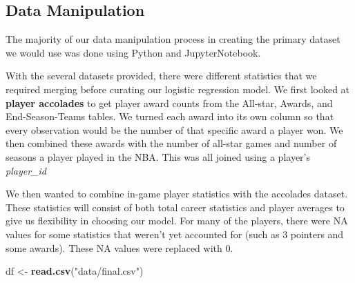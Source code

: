 \documentclass[
  11pt,
]{article}
\newenvironment{Shaded}{\begin{snugshade}}{\end{snugshade}}
\newcommand{\FunctionTok}[1]{\textcolor[rgb]{0.13,0.29,0.53}{\textbf{#1}}}
\newcommand{\NormalTok}[1]{#1}
\newcommand{\OtherTok}[1]{\textcolor[rgb]{0.56,0.35,0.01}{#1}}
\newcommand{\StringTok}[1]{\textcolor[rgb]{0.31,0.60,0.02}{#1}}
\begin{document}
\subsection{Data Manipulation}\label{data-manipulation}

The majority of our data manipulation process in creating the primary
dataset we would use was done using Python and JupyterNotebook.

With the several datasets provided, there were different statistics that
we required merging before curating our logistic regression model. We
first looked at \textbf{player accolades} to get player award counts
from the All-star, Awards, and End-Season-Teams tables. We turned each
award into its own column so that every observation would be the number
of that specific award a player won. We then combined these awards with
the number of all-star games and number of seasons a player played in
the NBA. This was all joined using a player's \emph{player\_id}

We then wanted to combine in-game player statistics with the accolades
dataset. These statistics will consist of both total career statistics
and player averages to give us flexibility in choosing our model. For
many of the players, there were NA values for some statistics that
weren't yet accounted for (such as 3 pointers and some awards). These NA
values were replaced with 0.

\begin{Shaded}
\begin{Highlighting}[]
\NormalTok{df }\OtherTok{\textless{}{-}} \FunctionTok{read.csv}\NormalTok{(}\StringTok{"data/final.csv"}\NormalTok{)}
\end{Highlighting}
\end{Shaded}
\end{document}
